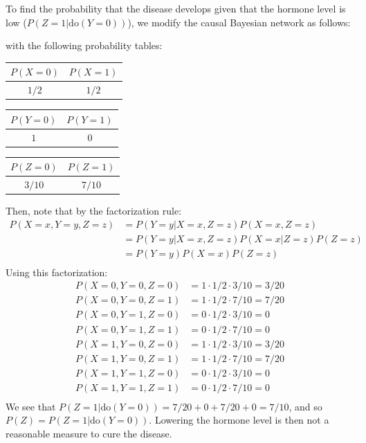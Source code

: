\documentclass{article}
\begin{document}
To find the probability that the disease develops given that the hormone level is low ($P(Z = 1 | \mathrm{do}(Y = 0))$), we modify the causal Bayesian network as follows:
\begin{center}
\end{center}
with the following probability tables:
\begin{center}
\begin{tabular}{|c|c|}
    \hline
    $P(X = 0)$ & $P(X = 1)$ \\
    \hline
    $1/2$ & $1/2$ \\
    \hline
\end{tabular}
\begin{tabular}{|c|c|}
    \hline
    $P(Y = 0)$ & $P(Y = 1)$ \\
    \hline
    $1$ & $0$ \\
    \hline
\end{tabular}
\begin{tabular}{|c|c|}
    \hline
    $P(Z = 0)$ & $P(Z = 1)$ \\
    \hline
    $3/10$ & $7/10$ \\
    \hline
\end{tabular}
\end{center}
Then, note that by the factorization rule:
\begin{align*}
    P(X = x, Y = y, Z = z) & = P(Y = y | X = x, Z = z)P(X = x, Z = z) \\
    & = P(Y = y | X = x, Z = z)P(X = x | Z = z)P(Z = z) \\
    & = P(Y = y)P(X = x)P(Z = z) \\
\end{align*}
Using this factorization:
\begin{align*}
    P(X = 0, Y = 0, Z = 0) & = 1 \cdot 1/2 \cdot 3/10 = 3/20 \\
    P(X = 0, Y = 0, Z = 1) & = 1 \cdot 1/2 \cdot 7/10 = 7/20 \\
    P(X = 0, Y = 1, Z = 0) & = 0 \cdot 1/2 \cdot 3/10 = 0 \\
    P(X = 0, Y = 1, Z = 1) & = 0 \cdot 1/2 \cdot 7/10 = 0 \\
    P(X = 1, Y = 0, Z = 0) & = 1 \cdot 1/2 \cdot 3/10 = 3/20 \\
    P(X = 1, Y = 0, Z = 1) & = 1 \cdot 1/2 \cdot 7/10 = 7/20 \\
    P(X = 1, Y = 1, Z = 0) & = 0 \cdot 1/2 \cdot 3/10 = 0 \\
    P(X = 1, Y = 1, Z = 1) & = 0 \cdot 1/2 \cdot 7/10 = 0 \\
\end{align*}
We see that $P(Z = 1 | \mathrm{do}(Y = 0)) = 7/20 + 0 + 7/20 + 0 = 7/10$, and so $P(Z) = P(Z = 1 | \mathrm{do}(Y = 0))$. Lowering the hormone level is then not a reasonable measure to cure the disease.
\end{document}
